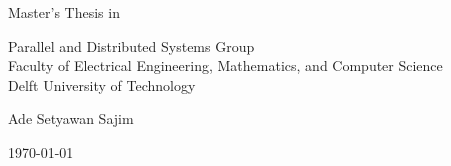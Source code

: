 \begin{titlepage}

  \begin{center}
  \null\vfill
    \begin{center}
    \LARGE{\reportTitle}
    \end{center}

    \vspace{3cm}

    \begin{large}
    Master's Thesis in \reportMSC
    \end{large}

    \vspace{1.5cm}

    \begin{normalsize}
    Parallel and Distributed Systems Group\\
    Faculty of Electrical Engineering, Mathematics, and Computer Science\\
    Delft University of Technology
    \end{normalsize}

    \vspace{2.0cm}

    \begin{normalsize}
    Ade Setyawan Sajim
    \end{normalsize}

    \vspace{1.0cm}

    \today            %

  \vfill
  \end{center}

\end{titlepage}
